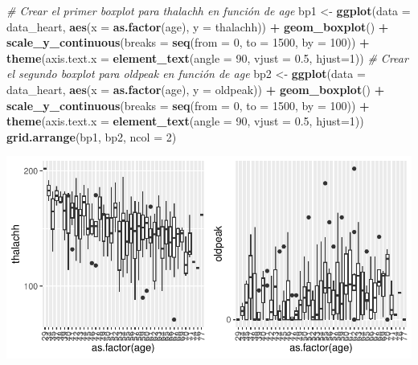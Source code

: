 \documentclass[
]{article}
\newenvironment{Shaded}{\begin{snugshade}}{\end{snugshade}}
\newcommand{\AttributeTok}[1]{\textcolor[rgb]{0.13,0.29,0.53}{#1}}
\newcommand{\CommentTok}[1]{\textcolor[rgb]{0.56,0.35,0.01}{\textit{#1}}}
\newcommand{\DecValTok}[1]{\textcolor[rgb]{0.00,0.00,0.81}{#1}}
\newcommand{\FloatTok}[1]{\textcolor[rgb]{0.00,0.00,0.81}{#1}}
\newcommand{\FunctionTok}[1]{\textcolor[rgb]{0.13,0.29,0.53}{\textbf{#1}}}
\newcommand{\NormalTok}[1]{#1}
\newcommand{\OtherTok}[1]{\textcolor[rgb]{0.56,0.35,0.01}{#1}}
\newcommand{\SpecialCharTok}[1]{\textcolor[rgb]{0.81,0.36,0.00}{\textbf{#1}}}
\begin{document}
\begin{Shaded}
\begin{Highlighting}[]
\CommentTok{\# Crear el primer boxplot para \textquotesingle{}thalachh\textquotesingle{} en función de \textquotesingle{}age\textquotesingle{}}
\NormalTok{bp1 }\OtherTok{\textless{}{-}} \FunctionTok{ggplot}\NormalTok{(}\AttributeTok{data =}\NormalTok{ data\_heart, }\FunctionTok{aes}\NormalTok{(}\AttributeTok{x =} \FunctionTok{as.factor}\NormalTok{(age), }\AttributeTok{y =}\NormalTok{ thalachh)) }\SpecialCharTok{+} 
  \FunctionTok{geom\_boxplot}\NormalTok{() }\SpecialCharTok{+} \FunctionTok{scale\_y\_continuous}\NormalTok{(}\AttributeTok{breaks =} \FunctionTok{seq}\NormalTok{(}\AttributeTok{from =} \DecValTok{0}\NormalTok{, }\AttributeTok{to =} \DecValTok{1500}\NormalTok{, }\AttributeTok{by =} \DecValTok{100}\NormalTok{)) }\SpecialCharTok{+}
  \FunctionTok{theme}\NormalTok{(}\AttributeTok{axis.text.x =} \FunctionTok{element\_text}\NormalTok{(}\AttributeTok{angle =} \DecValTok{90}\NormalTok{, }\AttributeTok{vjust =} \FloatTok{0.5}\NormalTok{, }\AttributeTok{hjust=}\DecValTok{1}\NormalTok{))}
\CommentTok{\# Crear el segundo boxplot para \textquotesingle{}oldpeak\textquotesingle{} en función de \textquotesingle{}age\textquotesingle{}}
\NormalTok{bp2 }\OtherTok{\textless{}{-}} \FunctionTok{ggplot}\NormalTok{(}\AttributeTok{data =}\NormalTok{ data\_heart, }\FunctionTok{aes}\NormalTok{(}\AttributeTok{x =} \FunctionTok{as.factor}\NormalTok{(age), }\AttributeTok{y =}\NormalTok{ oldpeak)) }\SpecialCharTok{+} 
  \FunctionTok{geom\_boxplot}\NormalTok{() }\SpecialCharTok{+} \FunctionTok{scale\_y\_continuous}\NormalTok{(}\AttributeTok{breaks =} \FunctionTok{seq}\NormalTok{(}\AttributeTok{from =} \DecValTok{0}\NormalTok{, }\AttributeTok{to =} \DecValTok{1500}\NormalTok{, }\AttributeTok{by =} \DecValTok{100}\NormalTok{)) }\SpecialCharTok{+}
  \FunctionTok{theme}\NormalTok{(}\AttributeTok{axis.text.x =} \FunctionTok{element\_text}\NormalTok{(}\AttributeTok{angle =} \DecValTok{90}\NormalTok{, }\AttributeTok{vjust =} \FloatTok{0.5}\NormalTok{, }\AttributeTok{hjust=}\DecValTok{1}\NormalTok{))}
\FunctionTok{grid.arrange}\NormalTok{(bp1, bp2, }\AttributeTok{ncol =} \DecValTok{2}\NormalTok{)}
\end{Highlighting}
\end{Shaded}

\includegraphics{coyolaf_ChristianOyola-PRA2_files/figure-latex/unnamed-chunk-8-1.pdf}
\end{document}
